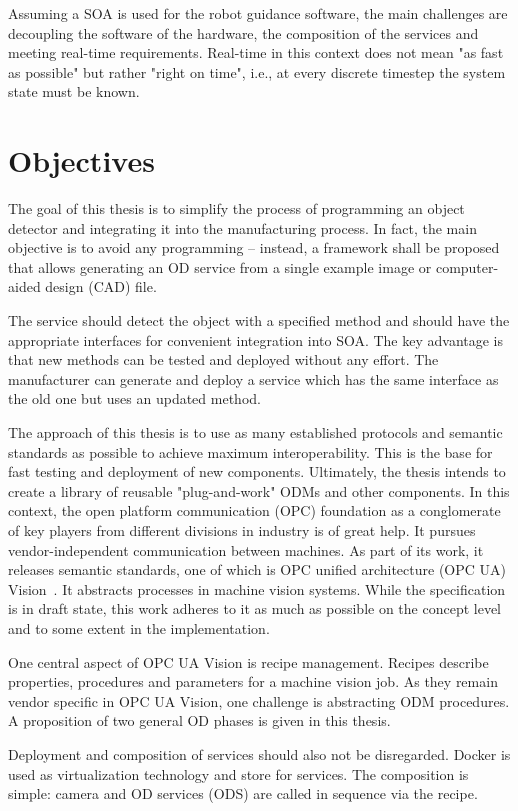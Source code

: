 Assuming a SOA is used for the robot guidance software, the main challenges are decoupling the software of the hardware, the composition of the services and meeting real-time requirements. Real-time in this context does not mean "as fast as possible" but rather "right on time", i.e., at every discrete timestep the system state must be known.

\section{Objectives}
The goal of this thesis is to simplify the process of programming an object detector and integrating it into the manufacturing process. In fact, the main objective is to avoid any programming – instead, a framework shall be proposed that allows generating an OD service from a single example image or computer-aided design (CAD) file.

The service should detect the object with a specified method and should have the appropriate interfaces for convenient integration into SOA. The key advantage is that new methods can be tested and deployed without any effort. The manufacturer can generate and deploy a service which has the same interface as the old one but uses an updated method.

The approach of this thesis is to use as many established protocols and semantic standards as possible to achieve maximum interoperability. This is the base for fast testing and deployment of new components. Ultimately, the thesis intends to create a library of reusable "plug-and-work" ODMs and other components. In this context, the open platform communication (OPC) foundation as a conglomerate of key players from different divisions in industry is of great help. It pursues vendor-independent communication between machines. As part of its work, it releases semantic standards, one of which is OPC unified architecture (OPC UA) Vision~\cite{VDMA2018OPC40100-1:2018-11}. It abstracts processes in machine vision systems. While the specification is in draft state, this work adheres to it as much as possible on the concept level and to some extent in the implementation. 

One central aspect of OPC UA Vision is recipe management. Recipes describe properties, procedures and parameters for a machine vision job. As they remain vendor specific in OPC UA Vision, one challenge is abstracting ODM procedures. A proposition of two general OD phases is given in this thesis.

Deployment and composition of services should also not be disregarded. Docker is used as virtualization technology and store for services. The composition is simple: camera and OD services (ODS) are called in sequence via the recipe.

